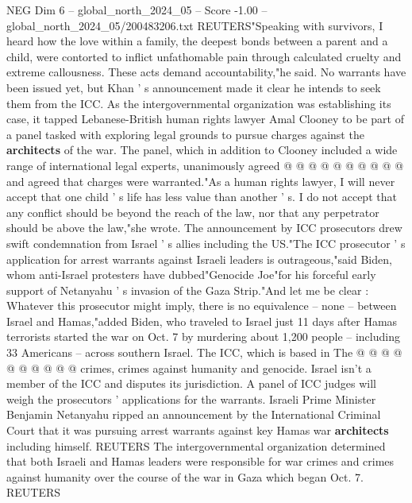 \begin{textsample}{NEG Dim 6 – global\_north\_2024\_05 – Score -1.00 – global\_north\_2024\_05/200483206.txt}
REUTERS"Speaking with survivors, I heard how the love within a family, the deepest bonds between a parent and a child, were contorted to inflict unfathomable pain through calculated cruelty and extreme callousness.
These acts demand accountability,"he said.
No warrants have been issued yet, but Khan ' s announcement made it clear he intends to seek them from the ICC.
As the intergovernmental organization was establishing its case, it tapped Lebanese-British human rights lawyer Amal Clooney to be part of a panel tasked with exploring legal grounds to pursue charges against the \textbf{architects} of the war.
The panel, which in addition to Clooney included a wide range of international legal experts, unanimously agreed @ @ @ @ @ @ @ @ @ @ and agreed that charges were warranted."As a human rights lawyer, I will never accept that one child ' s life has less value than another ' s.
I do not accept that any conflict should be beyond the reach of the law, nor that any perpetrator should be above the law,"she wrote.
The announcement by ICC prosecutors drew swift condemnation from Israel ' s allies including the US."The ICC prosecutor ' s application for arrest warrants against Israeli leaders is outrageous,"said Biden, whom anti-Israel protesters have dubbed"Genocide Joe"for his forceful early support of Netanyahu ' s invasion of the Gaza Strip."And let me be clear : Whatever this prosecutor might imply, there is no equivalence -- none -- between Israel and Hamas,"added Biden, who traveled to Israel just 11 days after Hamas terrorists started the war on Oct. 7 by murdering about 1,200 people -- including 33 Americans -- across southern Israel.
The ICC, which is based in The @ @ @ @ @ @ @ @ @ @ crimes, crimes against humanity and genocide.
Israel isn't a member of the ICC and disputes its jurisdiction.
A panel of ICC judges will weigh the prosecutors ' applications for the warrants.
Israeli Prime Minister Benjamin Netanyahu ripped an announcement by the International Criminal Court that it was pursuing arrest warrants against key Hamas war \textbf{architects} including himself.
REUTERS The intergovernmental organization determined that both Israeli and Hamas leaders were responsible for war crimes and crimes against humanity over the course of the war in Gaza which began Oct. 7.
REUTERS

\end{textsample}
